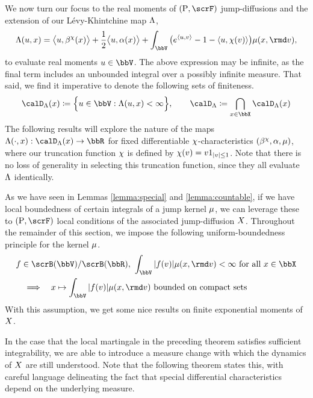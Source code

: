 We now turn our focus to the real moments of $(\Prb, \scrF)$ jump-diffusions and the extension of our L\'evy-Khintchine map $\Lambda$,
\begin{equation*}
  \ode(\momentVar, \stateVar) = \bprj{\momentVar}{\affDrift^\trunc(\stateVar)} + \frac12\bprj{\momentVar}{\affDiff(\stateVar)} + \int_\vecSpace \big( e^\prj{\momentVar}{\markVar} - 1 - \prj{\momentVar}{\trunc(\markVar)} \big) \affJump(\stateVar, \rmd\markVar), 
\end{equation*}
to evaluate real moments $\momentVar \in \vecSpace$.
The above expression may be infinite, as the final term includes an unbounded integral over a possibly infinite measure.
That said, we find it imperative to denote the following sets of finiteness.
\begin{equation}
  \label{eq:odeSpace-general}
  \odeSpace(\stateVar) \defeq \Big\{ \momentVar \in \vecSpace : \ode(\momentVar, \stateVar) < \infty \Big\}, \qquad
  \odeSpace \defeq \bigcap_{\stateVar \in \stateSpace} \odeSpace(\stateVar)
\end{equation}
The following results will explore the nature of the maps $\ode(\cdot,\stateVar): \odeSpace(\stateVar) \rightarrow \bbR$ for fixed differentiable $\chi$-characteristics $(\beta^\chi, \alpha, \mu)$, where our truncation function $\chi$ is defined by $\chi(v) = v 1_{|v|\leq 1}$.
Note that there is no loss of generality in selecting this truncation function, since they all evaluate $\Lambda$ identically.





As we have seen in Lemmas \ref{lemma:special} and \ref{lemma:countable}, if we have local boundedness of certain integrals of a jump kernel $\mu$, we can leverage these to $(\Prb, \scrF)$ local conditions of the associated jump-diffusion $X$.
Throughout the remainder of this section, we impose the following uniform-boundedness principle for the kernel $\mu$.
\begin{equation}
  \label{eq:affJump-regularity}
  \begin{aligned}
    &f \in \scrB(\vecSpace)/\scrB(\bbR), ~ \int_\vecSpace |f(\markVar)| \affJump(\stateVar, \rmd\markVar) < \infty \text{ for all } \stateVar \in \stateSpace \\
    &\quad\Longrightarrow\quad \stateVar \mapsto \int_\vecSpace |f(\markVar)| \affJump(\stateVar, \rmd\markVar) \text{ bounded on compact sets}
  \end{aligned}
\end{equation}
With this assumption, we get some nice results on finite exponential moments of $X$.





In the case that the local martingale in the preceding theorem satisfies sufficient integrability, we are able to introduce a measure change with which the dynamics of $X$ are still understood.
Note that the following theorem states this, with careful language delineating the fact that special differential characteristics depend on the underlying measure.


